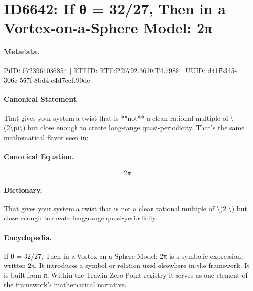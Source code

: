 \section*{ID6642: If θ = 32/27, Then in a Vortex-on-a-Sphere Model: 2π}
\paragraph{Metadata.}
PiID: 0723961036854 | RTEID: RTE:P25792.3610:T4.7988 | UUID: d41f53d5-306c-567f-8bd4-e4d7cefe90de

\paragraph{Canonical Statement.}
That gives your system a twist that is **not** a clean rational multiple of \textbackslash{}(2\textbackslash{}pi\textbackslash{}) but close enough to create long-range quasi-periodicity. That’s the same mathematical flavor seen in:

\paragraph{Canonical Equation.}
\[
2\pi
\]

\paragraph{Dictionary.}
That gives your system a twist that is not a clean rational multiple of \textbackslash{}(2 \textbackslash{}) but close enough to create long-range quasi-periodicity.

\paragraph{Encyclopedia.}
If θ = 32/27, Then in a Vortex-on-a-Sphere Model: 2π is a symbolic expression, written 2π. It introduces a symbol or relation used elsewhere in the framework. It is built from π. Within the Trawin Zero Point registry it serves as one element of the framework's mathematical narrative.

